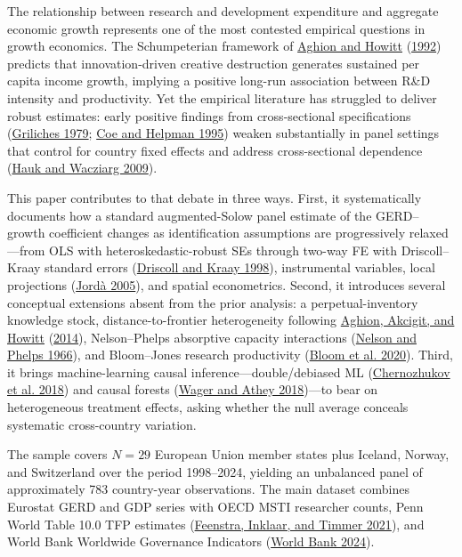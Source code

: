 \documentclass[
  11pt,
]{article}
\begin{document}
The relationship between research and development expenditure and aggregate economic growth represents one of the most contested empirical questions in growth economics. The Schumpeterian framework of \protect\hyperlink{ref-aghion1992}{Aghion and Howitt} (\protect\hyperlink{ref-aghion1992}{1992}) predicts that innovation-driven creative destruction generates sustained per capita income growth, implying a positive long-run association between R\&D intensity and productivity. Yet the empirical literature has struggled to deliver robust estimates: early positive findings from cross-sectional specifications (\protect\hyperlink{ref-griliches1979}{Griliches 1979}; \protect\hyperlink{ref-coe1995}{Coe and Helpman 1995}) weaken substantially in panel settings that control for country fixed effects and address cross-sectional dependence (\protect\hyperlink{ref-hauk2009}{Hauk and Wacziarg 2009}).

This paper contributes to that debate in three ways. First, it systematically documents how a standard augmented-Solow panel estimate of the GERD--growth coefficient changes as identification assumptions are progressively relaxed---from OLS with heteroskedastic-robust SEs through two-way FE with Driscoll--Kraay standard errors (\protect\hyperlink{ref-driscollkraay1998}{Driscoll and Kraay 1998}), instrumental variables, local projections (\protect\hyperlink{ref-jorda2005}{Jordà 2005}), and spatial econometrics. Second, it introduces several conceptual extensions absent from the prior analysis: a perpetual-inventory knowledge stock, distance-to-frontier heterogeneity following \protect\hyperlink{ref-aghion2014}{Aghion, Akcigit, and Howitt} (\protect\hyperlink{ref-aghion2014}{2014}), Nelson--Phelps absorptive capacity interactions (\protect\hyperlink{ref-nelsonphelps1966}{Nelson and Phelps 1966}), and Bloom--Jones research productivity (\protect\hyperlink{ref-bloom2020}{Bloom et al. 2020}). Third, it brings machine-learning causal inference---double/debiased ML (\protect\hyperlink{ref-chernozhukov2018}{Chernozhukov et al. 2018}) and causal forests (\protect\hyperlink{ref-wagerathey2018}{Wager and Athey 2018})---to bear on heterogeneous treatment effects, asking whether the null average conceals systematic cross-country variation.

The sample covers \(N = 29\) European Union member states plus Iceland, Norway, and Switzerland over the period 1998--2024, yielding an unbalanced panel of approximately 783 country-year observations. The main dataset combines Eurostat GERD and GDP series with OECD MSTI researcher counts, Penn World Table 10.0 TFP estimates (\protect\hyperlink{ref-pwt100}{Feenstra, Inklaar, and Timmer 2021}), and World Bank Worldwide Governance Indicators (\protect\hyperlink{ref-worldbank_wgi}{World Bank 2024}).
\end{document}
